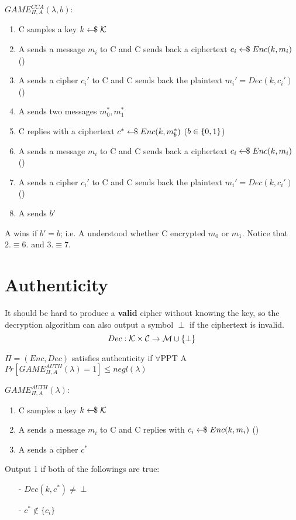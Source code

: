 $GAME_{\Pi, A}^{CCA} (\lambda,b)$:
\begin{enumerate}
    \item C samples a key $k \leftarrow\kern-0.42em{\$} \; \mathcal{K}$
    \item A sends a message $m_i$ to C and C sends back a ciphertext $c_i \leftarrow\kern-0.42em{\$} \; Enc(k,m_i)$ (\poly)
    \item A sends a cipher $c_i'$ to C and C sends back the plaintext $m_i' = Dec(k,c_i')$ (\poly)
    \item A sends two messages $m_0^*,m_1^*$
    \item C replies with a ciphertext $c^* \leftarrow\kern-0.42em{\$} \; Enc(k,m_b^*)$ ($b \in \{0,1\}$)
    \item A sends a message $m_i$ to C and C sends back a ciphertext $c_i \leftarrow\kern-0.42em{\$} \; Enc(k,m_i)$ (\poly)
    \item A sends a cipher $c_i'$ to C and C sends back the plaintext $m_i' = Dec(k,c_i')$ (\poly)
    \item A sends $b'$
\end{enumerate}
A wins if $b' = b$; i.e. A understood whether C encrypted $m_0$ or $m_1$.\newline
Notice that $2. \equiv 6.$ and $3. \equiv 7.$


\section{Authenticity}
It should be hard to produce a \textbf{valid} cipher without knowing the key, so the decryption algorithm can also output a symbol $\perp$ if the ciphertext is invalid.
\[ Dec : \mathcal{K} \times \mathcal{C}  \rightarrow \mathcal{M} \cup \{\perp\} \]

$\Pi = (Enc,Dec)$ satisfies authenticity if $\forall$PPT A $Pr[GAME_{\Pi,A}^{AUTH} (\lambda) = 1] \leq negl(\lambda)$

$GAME_{\Pi,A}^{AUTH} (\lambda)$:
\begin{enumerate}
    \item C samples a key $k \leftarrow\kern-0.42em{\$} \; \mathcal{K}$
    \item A sends a message $m_i$ to C and C replies with $c_i \leftarrow\kern-0.42em{\$} \; Enc(k,m_i)$ (\poly)
    \item A sends a cipher $c^*$
\end{enumerate}
Output 1 if both of the followings are true:
\begin{itemize}
    \item[-] $Dec(k,c^*) \neq \perp$
    \item[-] $c^* \not\in \{ c_i \}$
\end{itemize}